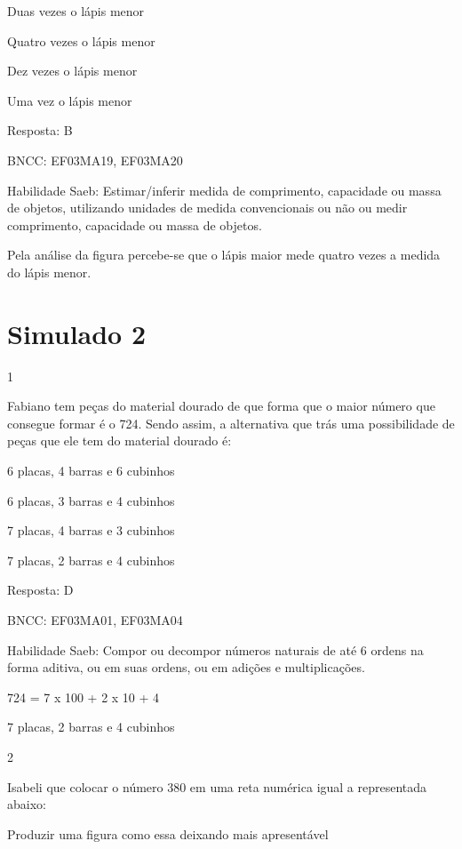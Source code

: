 \begin{escolha}
{\begin{escolha}
{\begin{escolha}
\item
  Duas vezes o lápis menor
\item
  Quatro vezes o lápis menor
\item
  Dez vezes o lápis menor
\item
  Uma vez o lápis menor
\end{escolha}

Resposta: B

BNCC: EF03MA19, EF03MA20

Habilidade Saeb: Estimar/inferir medida de comprimento, capacidade ou
massa de objetos, utilizando unidades de medida convencionais ou não ou
medir comprimento, capacidade ou massa de objetos.

Pela análise da figura percebe-se que o lápis maior mede quatro vezes a
medida do lápis menor.

\chapter{Simulado 2}

\num{1}

Fabiano tem peças do material dourado de que forma que o maior número
que consegue formar é o 724. Sendo assim, a alternativa que trás uma
possibilidade de peças que ele tem do material dourado é:

\begin{escolha}
\item
  6 placas, 4 barras e 6 cubinhos
\item
  6 placas, 3 barras e 4 cubinhos
\item
  7 placas, 4 barras e 3 cubinhos
\item
  7 placas, 2 barras e 4 cubinhos
\end{escolha}

Resposta: D

BNCC: EF03MA01, EF03MA04

Habilidade Saeb: Compor ou decompor números naturais de até 6 ordens na
forma aditiva, ou em suas ordens, ou em adições e multiplicações.

724 = 7 x 100 + 2 x 10 + 4

7 placas, 2 barras e 4 cubinhos

\num{2}

Isabeli que colocar o número 380 em uma reta numérica igual a
representada abaixo:

Produzir uma figura como essa deixando mais apresentável

}
\end{escolha}}
\end{escolha}
